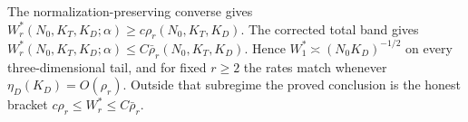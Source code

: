 The normalization-preserving converse gives \(W_r^*(N_0,K_T,K_D;\alpha)\ge c\rho_r(N_0,K_T,K_D)\). The corrected total band gives \(W_r^*(N_0,K_T,K_D;\alpha)\le C\bar\rho_r(N_0,K_T,K_D)\). Hence \(W_1^*\asymp(N_0K_D)^{-1/2}\) on every three-dimensional tail, and for fixed \(r\ge2\) the rates match whenever \(\eta_D(K_D)=O(\rho_r)\). Outside that subregime the proved conclusion is the honest bracket \(c\rho_r\le W_r^*\le C\bar\rho_r\).